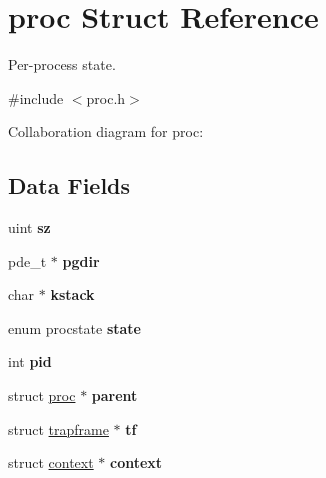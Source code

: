 \hypertarget{structproc}{}\section{proc Struct Reference}
\label{structproc}


Per-\/process state.  




{\ttfamily \#include $<$proc.\+h$>$}



Collaboration diagram for proc\+:
\subsection*{Data Fields}
\begin{DoxyCompactItemize}
\item 
\mbox{\label{structproc_a6e67042bb361124ff287af88efc33e00}} 
uint {\bfseries sz}
\item 
\mbox{\label{structproc_ad430afc653e9eb6cee33954d5545b79d}} 
pde\+\_\+t $\ast$ {\bfseries pgdir}
\item 
\mbox{\label{structproc_a9f556df98482bff6c9216013d7581ae4}} 
char $\ast$ {\bfseries kstack}
\item 
\mbox{\label{structproc_a0f2fe91548a1382672ae26e29ca9e736}} 
enum procstate {\bfseries state}
\item 
\mbox{\label{structproc_acf2bdf54d1f957ccbcdc987007029944}} 
int {\bfseries pid}
\item 
\mbox{\label{structproc_a14ea8849701ffafba4d142725de154d4}} 
struct \mbox{\hyperlink{structproc}{proc}} $\ast$ {\bfseries parent}
\item 
\mbox{\label{structproc_a56ec07ac1e10ce42adfc8dd2a366071f}} 
struct \mbox{\hyperlink{structtrapframe}{trapframe}} $\ast$ {\bfseries tf}
\item 
\mbox{\label{structproc_ae0d9bffe1ad1c7d60dd2733be0a2333c}} 
struct \mbox{\hyperlink{structcontext}{context}} $\ast$ {\bfseries context}
\item 
\mbox{\label{structproc_a03048a49756c2243576208ba4ec5fbd4}} 

\end{DoxyCompactItemize}
